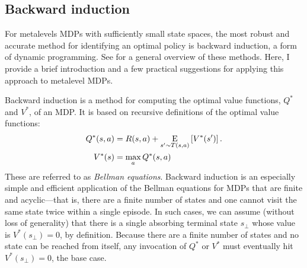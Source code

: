 \subsection{Backward induction}\label{sec:backinduct}

For metalevels MDPs with sufficiently small state spaces, the most robust and accurate method for identifying an optimal policy is backward induction, a form of dynamic programming. See \citet{puterman2014markov} for a general overview of these methods. Here, I provide a brief introduction and a few practical suggestions for applying this approach to metalevel MDPs.

Backward induction is a method for computing the optimal value functions, $Q^*$ and $V^*$, of an MDP. It is based on recursive definitions of the optimal value functions:
\begin{equation}\label{eq:value-recursive}
\begin{aligned}
    Q^*(s, a) &= R(s, a) + \expectunder{V^*(s')}{s' \sim T(s,a)}.\\
    V^*(s) &= \max_a Q^*(s, a)
\end{aligned}
\end{equation}
These are referred to as \emph{Bellman equations}. Backward induction is an especially simple and efficient application of the Bellman equations for MDPs that are finite and acyclic---that is, there are a finite number of states and one cannot visit the same state twice within a single episode. In such cases, we can assume (without loss of generality) that there is a single absorbing terminal state $s_\bot$ whose value is $V^*(s_\bot) = 0$, by definition. Because there are a finite number of states and no state can be reached from itself, any invocation of $Q^*$ or $V^*$ must eventually hit $V^*(s_\bot) = 0$, the base case.

